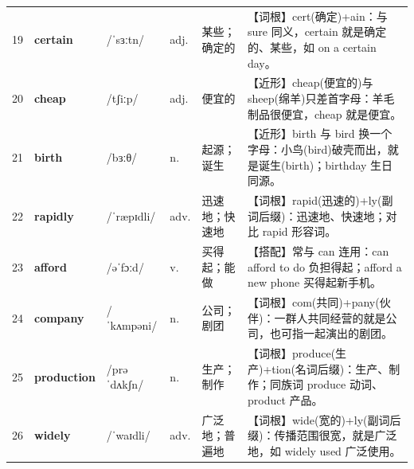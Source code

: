 \documentclass[UTF8,a4paper,11pt,oneside]{ctexbook}
\newcommand{\cellword}[1]{{\bfseries\textcolor{wordcol}{#1}}}
\newcommand{\cellipa}[1]{{\footnotesize\textcolor{ipacol}{#1}}}
\newcommand{\cellpos}[1]{\textcolor{poscol}{#1}}
\newcommand{\cellno}[1]{\textcolor{volcolor!75!black}{#1}}
\begin{document}
{\begin{longtable}{@{}C{0.045\textwidth}L{0.155\textwidth}L{0.175\textwidth}C{0.070\textwidth}L{0.180\textwidth}L{0.282\textwidth}@{}}
 \cellno{19} & \cellword{certain} & \cellipa{/ˈsɜːtn/} & \cellpos{adj.} & 某些；确定的 & \textcolor{tagRoot}{【词根】}cert(确定)+ain：与 sure 同义，certain 就是确定的、某些，如 on a certain day。 \\
\cellno{20} & \cellword{cheap} & \cellipa{/tʃiːp/} & \cellpos{adj.} & 便宜的 & \textcolor{tagNear}{【近形】}cheap(便宜的)与 sheep(绵羊)只差首字母：羊毛制品很便宜，cheap 就是便宜。 \\
 \cellno{21} & \cellword{birth} & \cellipa{/bɜːθ/} & \cellpos{n.} & 起源；诞生 & \textcolor{tagNear}{【近形】}birth 与 bird 换一个字母：小鸟(bird)破壳而出，就是诞生(birth)；birthday 生日同源。 \\
\cellno{22} & \cellword{rapidly} & \cellipa{/ˈræpɪdli/} & \cellpos{adv.} & 迅速地；快速地 & \textcolor{tagRoot}{【词根】}rapid(迅速的)+ly(副词后缀)：迅速地、快速地；对比 rapid 形容词。 \\
 \cellno{23} & \cellword{afford} & \cellipa{/əˈfɔːd/} & \cellpos{v.} & 买得起；能做 & \textcolor{tagColloc}{【搭配】}常与 can 连用：can afford to do 负担得起；afford a new phone 买得起新手机。 \\
\cellno{24} & \cellword{company} & \cellipa{/ˈkʌmpəni/} & \cellpos{n.} & 公司；剧团 & \textcolor{tagRoot}{【词根】}com(共同)+pany(伙伴)：一群人共同经营的就是公司，也可指一起演出的剧团。 \\
 \cellno{25} & \cellword{production} & \cellipa{/prəˈdʌkʃn/} & \cellpos{n.} & 生产；制作 & \textcolor{tagRoot}{【词根】}produce(生产)+tion(名词后缀)：生产、制作；同族词 produce 动词、product 产品。 \\
\cellno{26} & \cellword{widely} & \cellipa{/ˈwaɪdli/} & \cellpos{adv.} & 广泛地；普遍地 & \textcolor{tagRoot}{【词根】}wide(宽的)+ly(副词后缀)：传播范围很宽，就是广泛地，如 widely used 广泛使用。 \\
\end{longtable}
}

\end{document}
